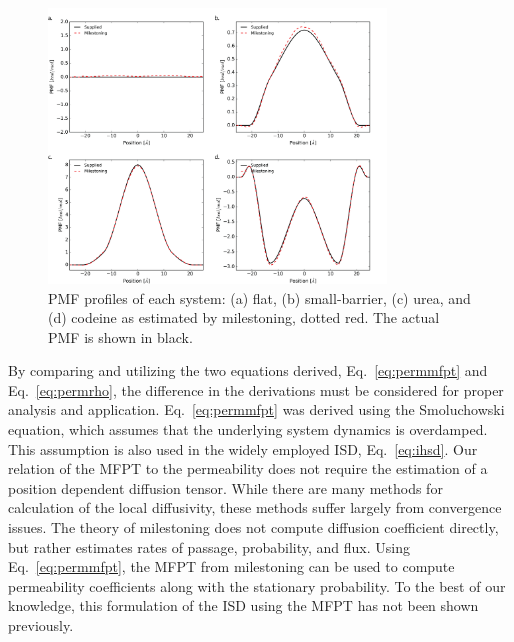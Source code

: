     \begin{figure}[htbp]
    \begin{center}
        \includegraphics[width=0.8\textwidth]{Figures/calcpmf}
        \caption{PMF profiles of each system: (a) flat, (b) small-barrier, (c) urea, and (d) codeine as estimated by milestoning, dotted red. The actual PMF is shown in black.}
        \label{fig:calcpmf}
    \end{center}
    \end{figure}

	\par By comparing and utilizing the two equations derived, Eq.~\ref{eq:permmfpt} and Eq.~\ref{eq:permrho}, the difference in the derivations must be considered for proper analysis and application. Eq.~\ref{eq:permmfpt} was derived using the Smoluchowski equation, which assumes that the underlying system dynamics is overdamped. This assumption is also used in the widely employed ISD, Eq.~\ref{eq:ihsd}. Our relation of the MFPT to the permeability does not require the estimation of a position dependent diffusion tensor. While there are many methods for calculation of the local diffusivity, these methods suffer largely from convergence issues\cite{Mamonov2006,Lee2016}. The theory of milestoning does not compute diffusion coefficient directly, but rather estimates rates of passage, probability, and flux. Using Eq.~\ref{eq:permmfpt}, the MFPT from milestoning can be used to compute permeability coefficients along with the stationary probability. To the best of our knowledge, this formulation of the ISD using the MFPT has not been shown previously.

